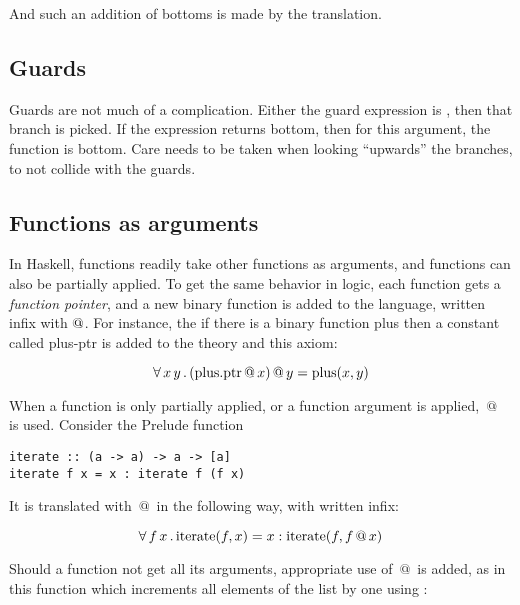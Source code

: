 And such an addition of bottoms is made by the translation.

\subsection{Guards}

Guards are not much of a complication. Either the guard expression is
, then that branch is picked. If the expression returns
bottom, then for this argument, the function is bottom. Care needs to
be taken when looking ``upwards'' the branches, to not collide with
the guards.

\subsection{Functions as arguments}

In Haskell, functions readily take other functions as arguments, and
functions can also be partially applied. To get the same behavior in
logic, each function gets a \emph{function pointer}, and a new binary
function is added to the language, written infix with $\mathrm{@}$.
For instance, the if there is a binary function plus then a constant
called plus-ptr is added to the theory and this axiom:

\begin{equation*}
\forall \, x \, y \, . \, (\mathrm{plus.ptr} \, @ \, x) \, @ \, y = \mathrm{plus}(x,y)
\end{equation*}

When a function is only partially applied, or a function argument is
applied, $\, @ \, $ is used. Consider the Prelude function 

\begin{verbatim}
iterate :: (a -> a) -> a -> [a]
iterate f x = x : iterate f (f x)
\end{verbatim}

It is translated with $\, @ \, $ in the following way, with \hs{:} written infix:

\begin{equation*}
\forall \, f \, x \, . \, \mathrm{iterate}(f,x) = x : \mathrm{iterate}(f,f \, @ \, x)
\end{equation*}

Should a function not get all its arguments, appropriate use of $\, @ \, $ is
added, as in this function which increments all elements of the list
by one using :

